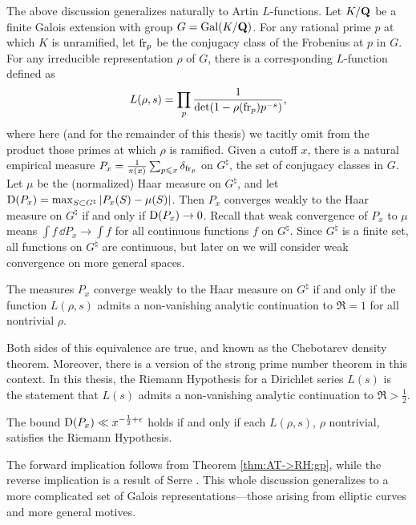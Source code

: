 The above discussion generalizes naturally to Artin $L$-functions. 
Let $K/\mathbf{Q}$ be a finite Galois extension with group $G=\operatorname{Gal}(K/\mathbf{Q})$. For any 
rational prime $p$ at which $K$ is unramified, let $\mathrm{fr}_p$ be the conjugacy 
class of the Frobenius at $p$ in $G$. For any irreducible representation 
$\rho$ of $G$, there is a corresponding $L$-function defined as 
\[
	L(\rho,s) = \prod_p \frac{1}{\det(1-\rho(\mathrm{fr}_p) p^{-s})} ,
\]
where here (and for the remainder of this thesis) we tacitly omit from the 
product those primes at which $\rho$ is ramified. Given a cutoff $x$, there is 
a natural empirical measure 
$P_x = \frac{1}{\pi(x)} \sum_{p\leqslant x} \delta_{\mathrm{fr}_p}$ on 
$G^\natural$, the set of conjugacy classes in $G$. Let $\mu$ be the 
(normalized) Haar measure on $G^\natural$, and let 
$\operatorname{D}(P_x) = \max_{S\subset G^\natural} \left| P_x(S) - \mu(S)\right|$. 
Then $P_x$ converges weakly to the Haar measure on $G^\natural$ if and 
only if $\operatorname{D}(P_x) \to 0$. Recall that weak convergence of $P_x$ to $\mu$ means 
$\int f\, \dd P_x \to \int f$ for all continuous functions $f$ on $G^\natural$. 
Since $G^\natural$ is a finite set, all functions on $G^\natural$ are 
continuous, but later on we will consider weak convergence on more general 
spaces.  

\begin{theorem}
The measures $P_x$ converge weakly to the Haar measure on $G^\natural$ if and 
only if the function $L(\rho,s)$ admits a non-vanishing analytic continuation 
to $\Re = 1$ for all nontrivial $\rho$. 
\end{theorem}

Both sides of this equivalence are true, and known as the Chebotarev density 
theorem. Moreover, there is a version of the strong prime number theorem in 
this context. In this thesis, the Riemann Hypothesis for a Dirichlet series 
$L(s)$ is the statement that $L(s)$ admits a non-vanishing analytic 
continuation to $\Re > \frac 1 2$. 

\begin{theorem}
The bound $\operatorname{D}(P_x) \ll x^{-\frac 1 2+\epsilon}$ holds if and only if each
$L(\rho,s)$, $\rho$ nontrivial, satisfies the Riemann Hypothesis. 
\end{theorem}

The forward implication follows from Theorem \ref{thm:AT->RH:gp}, while the reverse implication is a result of Serre \cite[Th.~4]{serre-1981}. 
This whole discussion generalizes to a more complicated set of Galois 
representations---those arising from elliptic curves and more general motives.  





